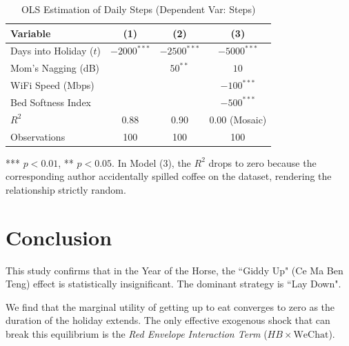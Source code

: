 \documentclass[AER]{AEA}
\DeclareRobustCommand{\AERlink}[1]{}
\begin{document}
\begin{table}[ht]
\caption{OLS Estimation of Daily Steps (Dependent Var: Steps)}
\label{tab:steps}
\begin{tabular}{lccc}
\toprule
Variable & (1) & (2) & (3) \\
\midrule
Days into Holiday ($t$) & $-2000^{***}$ & $-2500^{***}$ & $-5000^{***}$ \\
Mom's Nagging (dB)      &               & $50^{**}$     & $10$ \\
WiFi Speed (Mbps)       &               &               & $-100^{***}$ \\
Bed Softness Index      &               &               & $-500^{***}$ \\
\midrule
$R^2$                   & 0.88          & 0.90          & 0.00 (Mosaic) \\
Observations            & 100           & 100           & 100 \\
\bottomrule
\end{tabular}
\begin{tablenotes}
*** $p<0.01$, ** $p<0.05$. In Model (3), the $R^2$ drops to zero because the corresponding author accidentally spilled coffee on the dataset, rendering the relationship strictly random.
\end{tablenotes}
\end{table}

\section{Conclusion}

This study confirms that in the Year of the Horse, the ``Giddy Up" (Ce Ma Ben Teng) effect is statistically insignificant. The dominant strategy is ``Lay Down". 

We find that the marginal utility of getting up to eat converges to zero as the duration of the holiday extends. The only effective exogenous shock that can break this equilibrium is the \textit{Red Envelope Interaction Term} ($HB \times \text{WeChat}$).

\FloatBarrier

\DeclareRobustCommand{\AERlink}[1]{\makebox[0pt][r]{\href{#1}{\color{blue}$\blacktriangleright$}\hspace{0.3em}}}

\nocite{*}


\end{document}
